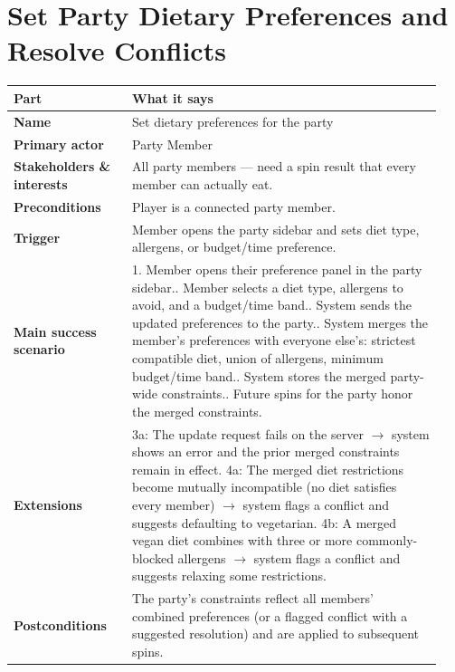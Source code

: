 \documentclass[11pt,twocolumn]{article}
\newcommand{\ucheader}{%
\textbf{Part} & \textbf{What it says} \\
\hline
\endhead
\hline
\endfoot
}
\begin{document}
\section{Set Party Dietary Preferences and Resolve Conflicts}
{\footnotesize
\begin{longtable}{@{}p{0.26\linewidth}p{0.68\linewidth}@{}}
\hline
\ucheader
\textbf{Name} & Set dietary preferences for the party \\
\hline
\textbf{Primary actor} & Party Member \\
\hline
\textbf{Stakeholders \& interests} & All party members --- need a spin result that every member can actually eat. \\
\hline
\textbf{Preconditions} & Player is a connected party member. \\
\hline
\textbf{Trigger} & Member opens the party sidebar and sets diet type, allergens, or budget/time preference. \\
\hline
\textbf{Main success scenario} & 1. Member opens their preference panel in the party sidebar.\newline
2. Member selects a diet type, allergens to avoid, and a budget/time band.\newline
3. System sends the updated preferences to the party.\newline
4. System merges the member's preferences with everyone else's: strictest compatible diet, union of allergens, minimum budget/time band.\newline
5. System stores the merged party-wide constraints.\newline
6. Future spins for the party honor the merged constraints. \\
\hline
\textbf{Extensions} & 3a: The update request fails on the server $\rightarrow$ system shows an error and the prior merged constraints remain in effect.\newline
4a: The merged diet restrictions become mutually incompatible (no diet satisfies every member) $\rightarrow$ system flags a conflict and suggests defaulting to vegetarian.\newline
4b: A merged vegan diet combines with three or more commonly-blocked allergens $\rightarrow$ system flags a conflict and suggests relaxing some restrictions. \\
\hline
\textbf{Postconditions} & The party's constraints reflect all members' combined preferences (or a flagged conflict with a suggested resolution) and are applied to subsequent spins. \\
\hline
\end{longtable}
}
\end{document}

